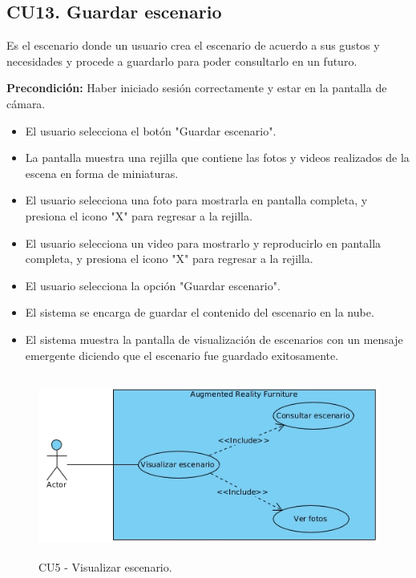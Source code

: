 \subsection{CU13. Guardar escenario}\par
Es el escenario donde un usuario crea el escenario de acuerdo a sus gustos y necesidades y procede a guardarlo para poder consultarlo en un futuro.\par
\textbf{Precondición:} Haber iniciado sesión correctamente y estar en la pantalla de cámara.\par
\begin{itemize}
	\item El usuario selecciona el botón "Guardar escenario".
	\item La pantalla muestra una rejilla que contiene las fotos y videos realizados de la escena en forma de miniaturas.
	\item El usuario selecciona una foto para mostrarla en pantalla completa, y presiona el icono "X" para regresar a la rejilla.
	\item El usuario selecciona un video para mostrarlo y reproducirlo en pantalla completa, y presiona el icono "X" para regresar a la rejilla.
	\item El usuario selecciona la opción "Guardar escenario".
	\item El sistema se encarga de guardar el contenido del escenario en la nube.
	\item El sistema muestra la pantalla de visualización de escenarios con un mensaje emergente diciendo que el escenario fue guardado exitosamente.
\end{itemize}

\begin{figure}[h!]
	\centering
	\includegraphics[width=12cm,height=6cm]{imagenes/analisis/visualizarEscenario.jpg}
	\caption{CU5 - Visualizar escenario.}
	\label{fig:analogo}
\end{figure}
